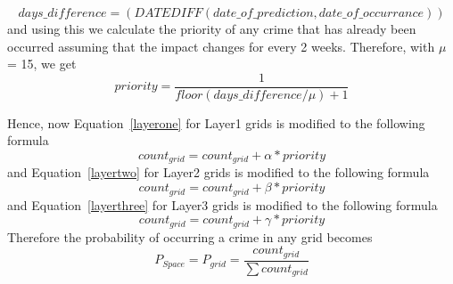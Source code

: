 \documentclass{sig-alternate}
\begin{document}
	\begin{equation}
	days\_difference = (DATEDIFF(date\_of\_prediction,date\_of\_occurrance))
       \label{setdatediff}
	\end{equation}
	and using this we calculate the  priority of any crime that has already been occurred assuming that the impact changes for every 2 weeks. Therefore, with $\mu$ = 15, we get
	\begin{equation}
	 priority = 
	    	     \frac{1}{floor(days\_difference/\mu)+1} 
                   \label{setpriority}
	\end{equation}
	
	Hence, now Equation~\ref{layerone} for Layer1 grids is modified to the following formula
\begin{equation}
    count_{grid} = count_{grid} + \alpha * priority
    \label{layeronemod}
\end{equation}
and  Equation~\ref{layertwo}  for Layer2 grids is modified to the following formula
\begin{equation}
    count_{grid} = count_{grid} + \beta * priority
    \label{layertwomod}
\end{equation} 
and  Equation~\ref{layerthree}  for Layer3 grids is modified to the following formula
\begin{equation}
    count_{grid} = count_{grid} + \gamma * priority
    \label{layerthreemod}
\end{equation} 
Therefore the probability of occurring a crime in any grid becomes
\begin{equation}
    P_{Space} = P_{grid} = \frac{ count_{grid}}{\sum count_{grid}}
    \label{probgrid}
\end{equation}
\end{document}
